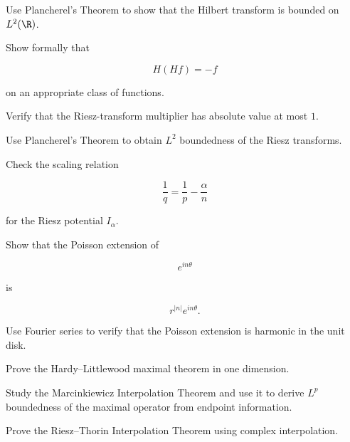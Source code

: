 \begin{exercise}[3]
Use Plancherel's Theorem to show that the Hilbert transform is bounded on
\(L^2(\R)\).
\end{exercise}

\begin{exercise}[3]
Show formally that

\[
H(Hf)=-f
\]

on an appropriate class of functions.
\end{exercise}

\begin{exercise}[3]
Verify that the Riesz-transform multiplier has absolute value at most
\(1\).
\end{exercise}

\begin{exercise}[3]
Use Plancherel's Theorem to obtain \(L^2\) boundedness of the Riesz
transforms.
\end{exercise}

\begin{exercise}[3]
Check the scaling relation

\[
\frac1q
=
\frac1p-\frac{\alpha}{n}
\]

for the Riesz potential \(I_\alpha\).
\end{exercise}

\begin{exercise}[3]
Show that the Poisson extension of

\[
e^{in\theta}
\]

is

\[
r^{|n|}e^{in\theta}.
\]
\end{exercise}

\begin{exercise}[3]
Use Fourier series to verify that the Poisson extension is harmonic in the
unit disk.
\end{exercise}

\begin{exercise}[4]
Prove the Hardy--Littlewood maximal theorem in one dimension.
\end{exercise}

\begin{exercise}[4]
Study the Marcinkiewicz Interpolation Theorem and use it to derive
\(L^p\) boundedness of the maximal operator from endpoint information.
\end{exercise}

\begin{exercise}[4]
Prove the Riesz--Thorin Interpolation Theorem using complex interpolation.
\end{exercise}

